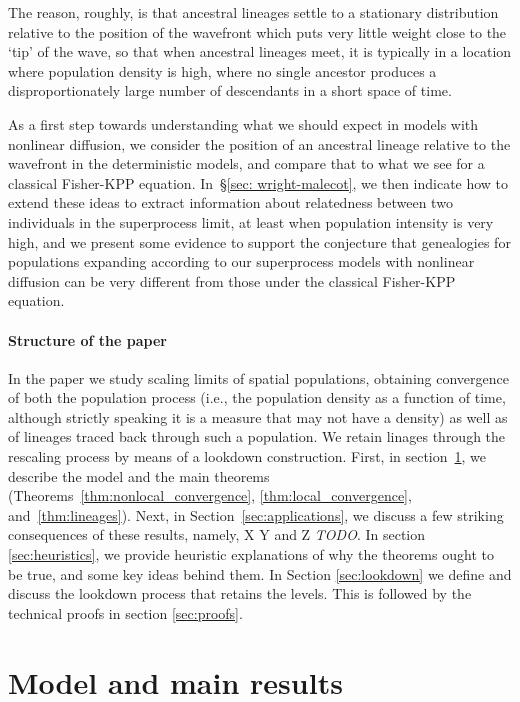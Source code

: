 \documentclass[12pt]{article}
\newcommand{\comment}[1]{{\color{blue} \it #1}}
\begin{document}
The reason, roughly, is that ancestral lineages
settle to a stationary distribution relative to the position of the 
wavefront which puts very little weight close to the `tip' of the wave, so
that when ancestral lineages meet,
it is typically in a location where population density is
high, where no single ancestor produces a disproportionately large number of 
descendants in a short space of time. 

As a first step towards understanding what we should expect in models with
nonlinear diffusion, we consider the position of an ancestral lineage
relative to the wavefront in the deterministic models, and compare that 
to what we see for a classical Fisher-KPP equation. 
In~\S\ref{sec: wright-malecot}, we then indicate how to extend these ideas to 
extract information about relatedness between two individuals in the 
superprocess limit, at least when population intensity is very high, and
we present some evidence to support the conjecture that genealogies 
for populations expanding according to 
our superprocess models with nonlinear diffusion
can be very different from those under 
the classical Fisher-KPP equation. 

\paragraph{Structure of the paper}
In the paper we study scaling limits of spatial populations,
obtaining convergence of both the population process
(i.e., the population density as a function of time,
although strictly speaking it is a measure that may not have a density)
as well as of lineages traced back through such a population.
We retain linages through the rescaling process
by means of a lookdown construction.
First, in section~\ref{sec: Model and main results},
we describe the model and the main theorems
(Theorems~\ref{thm:nonlocal_convergence}, \ref{thm:local_convergence}, and~\ref{thm:lineages}).
Next, in Section~\ref{sec:applications}, we discuss a few striking consequences of these results,
namely, X Y and Z \comment{TODO}.
In section \ref{sec:heuristics}, we provide heuristic explanations
of why the theorems ought to be true,
and some key ideas behind them.
In Section \ref{sec:lookdown} we define and discuss the lookdown process that retains the levels.
This is followed by the technical proofs in section \ref{sec:proofs}.



\section{Model and main results}
    \label{sec: Model and main results}
\end{document}
